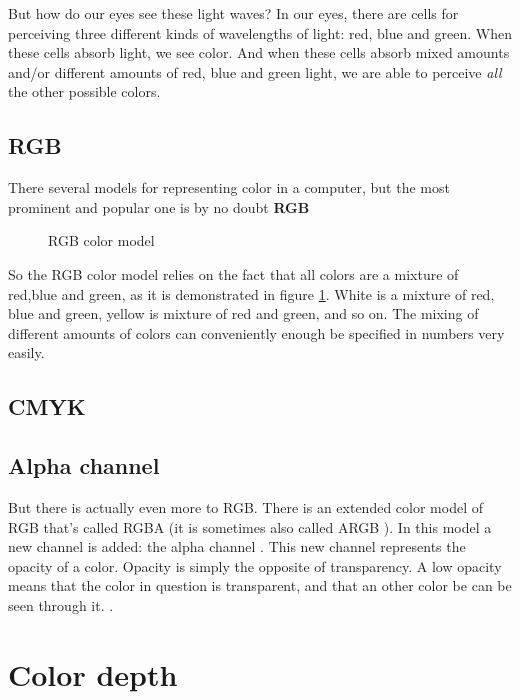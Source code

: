 But how do our eyes see these light waves? In our eyes, there are
cells for perceiving three different kinds of wavelengths of light:
red, blue and green. When these cells absorb light, we see color. And
when these cells absorb mixed amounts and/or different amounts of red,
blue and green light, we are able to perceive \textit{all} the other
possible colors.

\subsection{RGB}
\label{sec:rgb}

There several models for representing color in a computer, but the
most prominent and popular one is by no doubt \textbf{RGB} 

\begin{figure}[h]
  \centering
  
  \caption{RGB color model}
  \label{fig:rgb}
\end{figure}

So the RGB color model relies on the fact that all colors are a
mixture of red,blue and green, as it is demonstrated in figure
\ref{fig:rgb}. White is a mixture of red, blue and green, yellow is
mixture of red and green, and so on. The mixing of different amounts
of colors can conveniently enough be specified in numbers very
easily.

\subsection{CMYK}
\label{sec:cmyk}

\subsection{Alpha channel}
\label{sec:alpha_chan}


But there is actually even more to RGB. There is an extended color
model of RGB that's called RGBA (it is sometimes also
called ARGB ). In this model a new channel is added: the
alpha channel . This new channel represents the
opacity of a color. Opacity is simply the opposite of transparency.  A
low opacity means that the color in question is transparent,
 and that an other color be can be seen
through it.  \cite{porter84_compos_dig_img}.

\section{Color depth}
\label{sec:bit-depth}


